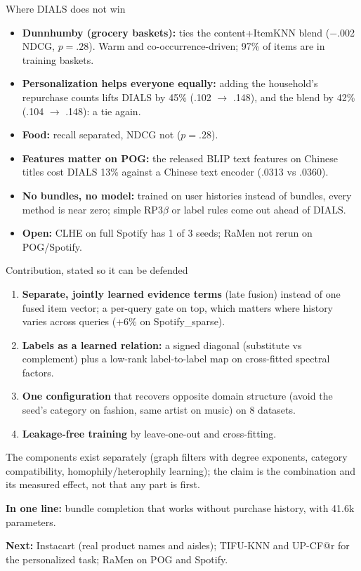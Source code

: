 \documentclass[10pt,aspectratio=169]{beamer}
\newcommand{\key}[1]{\textcolor{Accent}{\textbf{#1}}}
\newcommand{\fn}[1]{\textcolor{Muted}{\scriptsize #1}}
\begin{document}
\begin{frame}{Where DIALS does not win}
\begin{itemize}\setlength\itemsep{8pt}
\item \key{Dunnhumby (grocery baskets):} ties the content+ItemKNN blend ($-$.002 NDCG, $p=.28$). Warm and co-occurrence-driven; 97\% of items are in training baskets.
\item \key{Personalization helps everyone equally:} adding the household's repurchase counts lifts DIALS by 45\% (.102 $\to$ .148), and the blend by 42\% (.104 $\to$ .148): a tie again.
\item \key{Food:} recall separated, NDCG not ($p=.28$).
\item \key{Features matter on POG:} the released BLIP text features on Chinese titles cost DIALS 13\% against a Chinese text encoder (.0313 vs .0360).
\item \key{No bundles, no model:} trained on user histories instead of bundles, every method is near zero; simple RP3$\beta$ or label rules come out ahead of DIALS.
\item \key{Open:} CLHE on full Spotify has 1 of 3 seeds; RaMen not rerun on POG/Spotify.
\end{itemize}
\end{frame}

\begin{frame}{Contribution, stated so it can be defended}
\begin{enumerate}\setlength\itemsep{6pt}
\item \key{Separate, jointly learned evidence terms} (late fusion) instead of one fused item vector; a per-query gate on top, which matters where history varies across queries (+6\% on Spotify\_sparse).
\item \key{Labels as a learned relation:} a signed diagonal (substitute vs complement) plus a low-rank label-to-label map on cross-fitted spectral factors.
\item \key{One configuration} that recovers opposite domain structure (avoid the seed's category on fashion, same artist on music) on 8 datasets.
\item \key{Leakage-free training} by leave-one-out and cross-fitting.
\end{enumerate}
\vspace{1mm}
\fn{The components exist separately (graph filters with degree exponents, category compatibility, homophily/heterophily learning); the claim is the combination and its measured effect, not that any part is first.}\par
\vspace{1.5mm}
\key{In one line:} bundle completion that works without purchase history, with 41.6k parameters.\par
\vspace{1mm}
\key{Next:} Instacart (real product names and aisles); TIFU-KNN and UP-CF@r for the personalized task; RaMen on POG and Spotify.
\end{frame}
\end{document}
